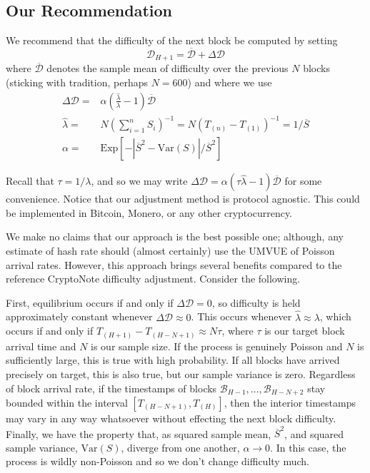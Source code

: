 \documentclass[12pt,english]{mrl}
\theoremstyle{definition}
\numberwithin{equation}{section}
\numberwithin{figure}{section}
\numberwithin{equation}{section}
\numberwithin{equation}{section}
\numberwithin{figure}{section}
\begin{document}
\subsection{Our Recommendation}

We recommend that the difficulty of the next block be computed by setting
\[\mathcal{D}_{H+1} = \overline{\mathcal{D}} + \Delta \mathcal{D}\]
where $\overline{\mathcal{D}}$ denotes the sample mean of difficulty over the previous $N$ blocks (sticking with tradition, perhaps $N=600$) and where we use
\begin{align}
\Delta \mathcal{D} =& \alpha (\frac{\hat{\lambda}}{\lambda} -1)\overline{\mathcal{D}}\\
\hat{\lambda}=& N\left(\sum_{i=1}^{n} S_i\right)^{-1} = N(T_{(n)} - T_{(1)})^{-1} = 1/\overline{S}\\
\alpha =& \text{Exp}\left[-\left|\overline{S}^2-\text{Var}(S)\right|/\overline{S}^2 \right]
\end{align}

Recall that $\tau = 1/\lambda$, and so we may write $\Delta \mathcal{D} = \alpha (\tau \hat{\lambda} -1)\overline{\mathcal{D}}$ for some convenience. Notice that our adjustment method is protocol agnostic. This could be implemented in Bitcoin, Monero, or any other cryptocurrency. 

We make no claims that our approach is the best possible one; although, any estimate of hash rate should (almost certainly) use the UMVUE of Poisson arrival rates. However, this approach brings several benefits compared to the reference CryptoNote difficulty adjustment. Consider the following.

First, equilibrium occurs if and only if $\Delta \mathcal{D} = 0$, so difficulty is held approximately constant whenever $\Delta \mathcal{D} \approx 0$. This occurs whenever $\hat{\lambda} \approx \lambda$, which occurs if and only if $T_{(H+1)} - T_{(H-N+1)} \approx N\tau$, where $\tau$ is our target block arrival time and $N$ is our sample size. If the process is genuinely Poisson and $N$ is sufficiently large, this is true with high probability. If all blocks have arrived precisely on target, this is also true, but our sample variance is zero.  Regardless of block arrival rate, if the timestamps of blocks $\mathcal{B}_{H-1}, \ldots, \mathcal{B}_{H-N+2}$ stay bounded within the interval $\left[T_{(H-N+1)}, T_{(H)}\right]$, then the interior timestamps may vary in any way whatsoever without effecting the next block difficulty. Finally, we have the property that, as squared sample mean, $\overline{S}^2$, and squared sample variance, $\text{Var}(S)$, diverge from one another, $\alpha \to 0$. In this case, the process is wildly non-Poisson and so we don't change difficulty much.
\end{document}
